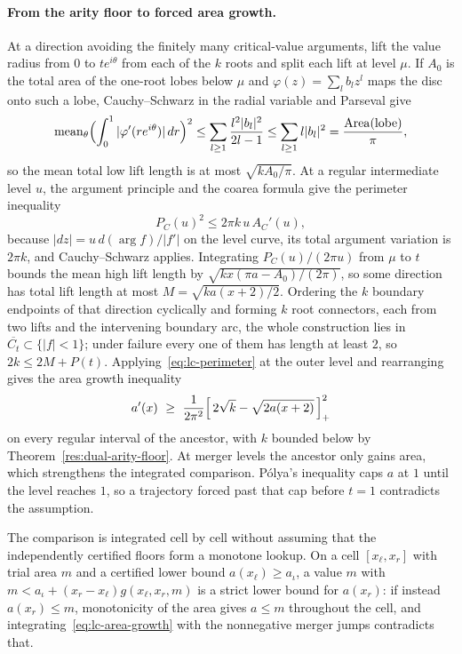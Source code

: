 \documentclass[11pt]{article}
\begin{document}
\paragraph{From the arity floor to forced area growth.}
At a direction avoiding the finitely many critical-value arguments, lift the
value radius from $0$ to $te^{i\theta}$ from each of the $k$ roots and split
each lift at level $\mu$.  If $A_0$ is the total area of the one-root lobes
below $\mu$ and $\varphi(z)=\sum_l b_lz^l$ maps the disc onto such a lobe,
Cauchy--Schwarz in the radial variable and Parseval give
\[
 \operatorname{mean}_\theta
   \Bigl(\int_0^1|\varphi'(re^{i\theta})|\,dr\Bigr)^2
 \le\sum_{l\ge1}\frac{l^2|b_l|^2}{2l-1}
 \le\sum_{l\ge1}l|b_l|^2
 =\frac{\operatorname{Area}(\text{lobe})}\pi,
\]
so the mean total low lift length is at most $\sqrt{kA_0/\pi}$.  At a regular
intermediate level $u$, the argument principle and the coarea formula give the
perimeter inequality
\begin{equation}\label{eq:lc-perimeter}
 P_C(u)^2\le2\pi k\,u\,A_C'(u),
\end{equation}
because $|dz|=u\,d(\arg f)/|f'|$ on the level curve, its total argument
variation is $2\pi k$, and Cauchy--Schwarz applies.  Integrating
$P_C(u)/(2\pi u)$ from $\mu$ to $t$ bounds the mean high lift length by
$\sqrt{kx(\pi a-A_0)/(2\pi)}$, so some direction has total lift length at most
$M=\sqrt{ka(x+2)/2}$.  Ordering the $k$ boundary endpoints of that direction
cyclically and forming $k$ root connectors, each from two lifts and the
intervening boundary arc, the whole construction lies in
$\overline{C_t}\subset\{|f|<1\}$; under failure every one of them has length
at least $2$, so $2k\le2M+P(t)$.  Applying~\eqref{eq:lc-perimeter} at the
outer level and rearranging gives the area growth inequality
\begin{equation}\label{eq:lc-area-growth}
 a'(x)\ \ge\ \frac1{2\pi^2}
 \Bigl[\,2\sqrt k-\sqrt{2a(x+2)}\,\Bigr]_{+}^{2}
\end{equation}
on every regular interval of the ancestor, with $k$ bounded below by
Theorem~\ref{res:dual-arity-floor}.  At merger levels the ancestor only gains
area, which strengthens the integrated comparison.  P\'olya's inequality caps
$a$ at $1$ until the level reaches $1$, so a trajectory forced past that cap
before $t=1$ contradicts the assumption.

The comparison is integrated cell by cell without assuming that the
independently certified floors form a monotone lookup.  On a cell
$[x_\ell,x_r]$ with trial area $m$ and a certified lower bound $a(x_\ell)\ge
a_\iota$, a value $m$ with $m<a_\iota+(x_r-x_\ell)g(x_\ell,x_r,m)$ is a strict
lower bound for $a(x_r)$: if instead $a(x_r)\le m$, monotonicity of the area
gives $a\le m$ throughout the cell, and integrating~\eqref{eq:lc-area-growth}
with the nonnegative merger jumps contradicts that.
\end{document}
